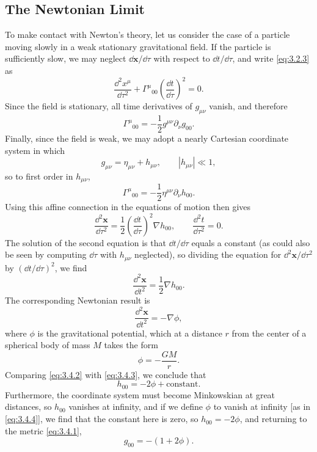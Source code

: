 
\subsection{The Newtonian Limit}\label{sec:3.4}

To make contact with Newton's theory, let us consider the case of a particle
moving slowly in a weak stationary gravitational field. If the particle is
sufficiently slow, we may neglect $\dd\mathbf x/\dd\tau$ with respect to
$\dd t/\dd\tau$, and write \eqref{eq:3.2.3} as
\[
  \frac{\dd^2x^\mu}{\dd\tau^2}
  +\Gamma^\mu{}_{00}\left(\frac{\dd t}{\dd\tau}\right)^2=0.
\]
Since the field is stationary, all time derivatives of $g_{\mu\nu}$ vanish,
and therefore
\[
  \Gamma^\mu{}_{00}=-\frac12g^{\mu\nu}\partial_\nu g_{00}.
\]
Finally, since the field is weak, we may adopt a nearly Cartesian coordinate
system in which
\begin{equation}
  g_{\mu\nu}=\eta_{\mu\nu}+h_{\mu\nu},
  \qquad |h_{\mu\nu}|\ll1,
  \tag{3.4.1}\label{eq:3.4.1}
\end{equation}
so to first order in $h_{\mu\nu}$,
\[
  \Gamma^\mu{}_{00}
  =-\frac12\eta^{\mu\nu}\partial_\nu h_{00}.
\]
Using this affine connection in the equations of motion then gives
\[
  \frac{\dd^2\mathbf x}{\dd\tau^2}
  =\frac12\left(\frac{\dd t}{\dd\tau}\right)^2\nabla h_{00},
  \qquad
  \frac{\dd^2t}{\dd\tau^2}=0.
\]
The solution of the second equation is that $\dd t/\dd\tau$ equals a
constant (as could also be seen by computing $\dd\tau$ with $h_{\mu\nu}$
neglected), so dividing the equation for $\dd^2\mathbf x/\dd\tau^2$ by
$(\dd t/\dd\tau)^2$, we find
\begin{equation}
  \frac{\dd^2\mathbf x}{\dd t^2}=\frac12\nabla h_{00}.
  \tag{3.4.2}\label{eq:3.4.2}
\end{equation}
The corresponding Newtonian result is
\begin{equation}
  \frac{\dd^2\mathbf x}{\dd t^2}=-\nabla\phi,
  \tag{3.4.3}\label{eq:3.4.3}
\end{equation}
where $\phi$ is the gravitational potential, which at a distance $r$ from
the center of a spherical body of mass $M$ takes the form
\begin{equation}
  \phi=-\frac{GM}{r}.
  \tag{3.4.4}\label{eq:3.4.4}
\end{equation}
Comparing \eqref{eq:3.4.2} with \eqref{eq:3.4.3}, we conclude that
\[
  h_{00}=-2\phi+\text{constant}.
\]
Furthermore, the coordinate system must become Minkowskian at great
distances, so $h_{00}$ vanishes at infinity, and if we define $\phi$ to
vanish at infinity [as in \eqref{eq:3.4.4}], we find that the constant here
is zero, so $h_{00}=-2\phi$, and returning to the metric
\eqref{eq:3.4.1},
\begin{equation}
  g_{00}=-(1+2\phi).
  \tag{3.4.5}\label{eq:3.4.5}
\end{equation}

